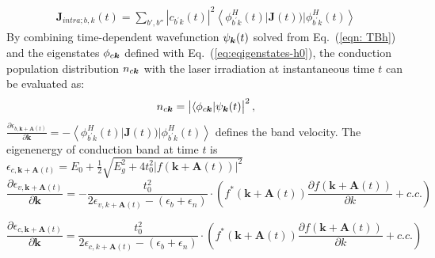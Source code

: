 \begin{equation}
\begin{array}{l}
\boldsymbol{J}_{intra;b,k}(t)=\sum\limits_{b',b''}\left|c_{b^{\prime} k}(t)\right|^{2}\left\langle \phi_{b^{\prime} k}^{H}(t)|\boldsymbol{J}(t))| \phi_{b^{\prime} k}^{H}(t)\right\rangle
\end{array}
    \label{intracurrent}
\end{equation}
By combining time-dependent wavefunction $\psi_{\boldsymbol{k}}(t)$ solved from Eq.~(\ref{eqn: TBh}) and the eigenstates $\phi_{c\boldsymbol{k}}$ defined with Eq.~(\ref{eq:eqigenstates-h0}), the conduction population distribution $n_{c \boldsymbol{k}}$ with the laser irradiation at instantaneous time $t$  can be evaluated as:
\begin{equation}
  n_{c\boldsymbol{k}} = \left | \langle \phi_{c\boldsymbol{k}} | \psi_{\boldsymbol{k}}(t) \right |^2,
  \label{eq:population_tdse}
\end{equation}
$\frac{\partial\epsilon_{b,\boldsymbol{k}+\boldsymbol{A}(t)}}{\partial\boldsymbol{k}} = -\left\langle \phi_{b^{\prime} k}^{H}(t)|\boldsymbol{J}(t))| \phi_{b^{\prime} k}^{H}(t)\right\rangle$ defines the band velocity. The eigenenergy of conduction band at time $t$ is $\epsilon_{c,\boldsymbol{k}+\boldsymbol{A}(t)}=E_{0} + \frac{1}{2} \sqrt{E_{g}^{2}+4t_{0}^{2}|f(\boldsymbol{k}+\boldsymbol{A}(t))|^{2}}$\\

\begin{equation}
    \frac{\partial\epsilon_{v,\boldsymbol{k}+\boldsymbol{A}(t)}}{\partial\boldsymbol{k}}=-\frac{t_0^2}{2\epsilon_{v,k+\boldsymbol{A}(t)}-(\epsilon_b+\epsilon_n)}\cdot (f^*(\boldsymbol{k}+\boldsymbol{A}(t))\frac{\partial f(\boldsymbol{k}+\boldsymbol{A}(t))}{\partial k}+c.c.)
    \label{band velocity_v}
\end{equation}

\begin{equation}
    \frac{\partial\epsilon_{c,\boldsymbol{k}+\boldsymbol{A}(t)}}{\partial\boldsymbol{k}}=\frac{t_0^2}{2\epsilon_{c,k+\boldsymbol{A}(t)}-(\epsilon_b+\epsilon_n)}\cdot (f^*(\boldsymbol{k}+\boldsymbol{A}(t))\frac{\partial f(\boldsymbol{k}+\boldsymbol{A}(t))}{\partial k}+c.c.)
    \label{band velocity_c}
\end{equation}
